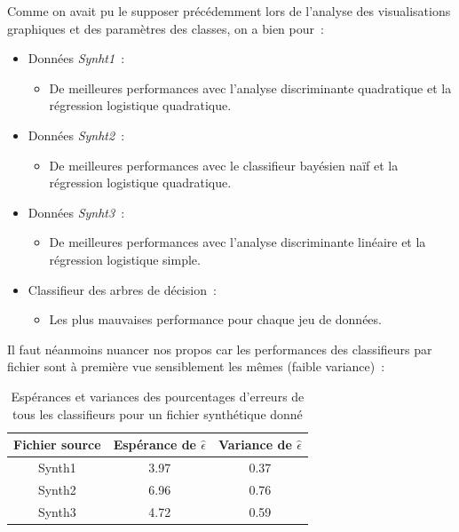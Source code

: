 \documentclass[a4paper,10pt]{report}
\begin{document}
Comme on avait pu le supposer précédemment lors de l'analyse des visualisations graphiques et des paramètres des classes, on a bien pour~:
\begin{itemize}
	\item Données \textit{Synht1}~:
	\begin{itemize}
		\item De meilleures performances avec l'analyse discriminante quadratique et la régression logistique quadratique.
	\end{itemize}
	\item Données \textit{Synht2}~:
	\begin{itemize}
		\item De meilleures performances avec le classifieur bayésien naïf et la régression logistique quadratique.
	\end{itemize}
	\item Données \textit{Synht3}~:
	\begin{itemize}
		\item De meilleures performances avec l'analyse discriminante linéaire et la régression logistique simple.
	\end{itemize}
	\item Classifieur des arbres de décision~:
	\begin{itemize}
		\item Les plus mauvaises performance pour chaque jeu de données.
	\end{itemize}
\end{itemize}




Il faut néanmoins nuancer nos propos car les performances des classifieurs par fichier sont à première vue sensiblement les mêmes (faible variance)~:
\begin{table}[H]
	\centering
	\captionsetup{justification=centering, margin=4cm}
	\begin{tabular}{c|c|c}
		Fichier source & Espérance de $\hat{\epsilon}$ & Variance de $\hat{\epsilon}$  \\ 
		\hline
		Synth1 & 3.97 & 0.37 \\ 
		Synth2 & 6.96 & 0.76  \\ 
		Synth3 & 4.72 & 0.59  \\ 
	\end{tabular}
	\caption{\small Espérances et variances des pourcentages d'erreurs de tous les classifieurs pour un fichier synthétique donné}
	\label{table:2-1-erreur-data-synth-mean-var}
\end{table}
\end{document}

